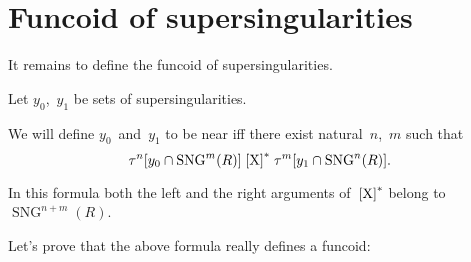 \chapter{Funcoid of supersingularities}

It remains to define the funcoid of supersingularities.

Let $y_0$,~$y_1$ be sets of supersingularities.

We will define $y_0$~and~$y_1$ to be near iff
there exist natural~$n$,~$m$ such that
\[ \tau^n[y_0\cap\operatorname{SNG}^m(R)] \mathrel{\left[\mathrm{X}\right]^{\ast}}
\tau^m[y_1\cap\operatorname{SNG}^n(R)]. \]

\begin{rem}
In this formula both the left and the right arguments of~$\mathrel{\left[\mathrm{X}\right]^{\ast}}$ belong to $\operatorname{SNG}^{n+m}(R)$.
\end{rem}

Let's prove that the above formula really defines a funcoid:

